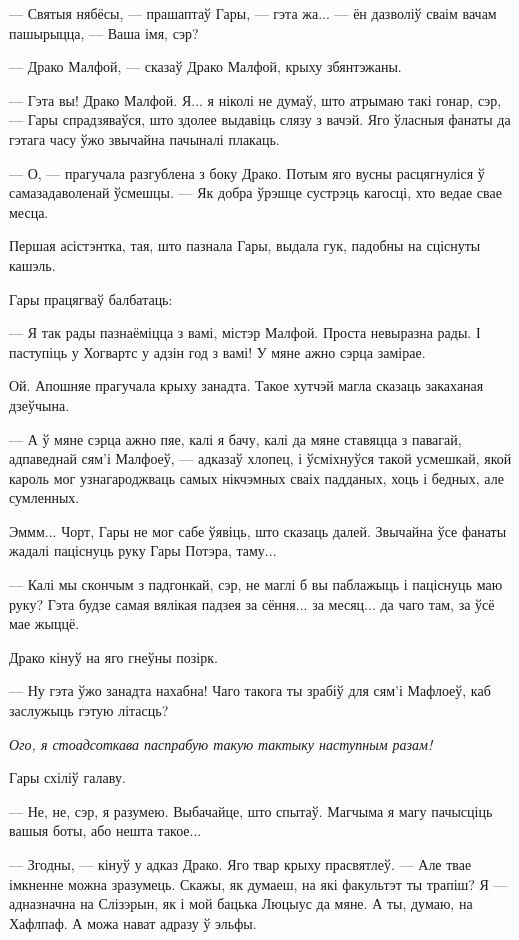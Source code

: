 --- Святыя нябёсы, --- прашаптаў Гары, --- гэта жа... --- ён дазволіў сваім вачам 
пашырыцца, --- Ваша імя, сэр?

--- Драко Малфой, --- сказаў Драко Малфой, крыху збянтэжаны.

--- Гэта вы! Драко Малфой. Я... я ніколі не думаў, што атрымаю такі гонар, сэр, --- 
Гары спрадзяваўся, што здолее выдавіць слязу з вачэй. Яго ўласныя фанаты да гэтага часу 
ўжо звычайна пачыналі плакаць.

--- О, --- прагучала разгублена з боку Драко. Потым яго вусны расцягнуліся ў самазадаволенай
ўсмешцы. --- Як добра ўрэшце сустрэць кагосці, хто ведае свае месца.

Першая асістэнтка, тая, што пазнала Гары, выдала гук, падобны на сціснуты кашэль.

Гары працягваў балбатаць:

--- Я так рады пазнаёміцца з вамі, містэр Малфой. Проста невыразна рады. І паступіць у Хогвартс 
у адзін год з вамі! У мяне ажно сэрца замірае.

Ой. Апошняе прагучала крыху занадта. Такое хутчэй магла сказаць закаханая дзеўчына.

--- А ў мяне сэрца ажно пяе, калі я бачу, калі да мяне ставяцца з павагай, адпаведнай 
сям'і Малфоеў, --- адказаў хлопец, і ўсміхнуўся такой усмешкай, якой кароль мог узнагароджваць
самых нікчэмных сваіх падданых, хоць і бедных, але сумленных.

Эммм... Чорт, Гары не мог сабе ўявіць, што сказаць далей. Звычайна ўсе фанаты жадалі паціснуць
руку Гары Потэра, таму...

--- Калі мы скончым з падгонкай, сэр, не маглі б вы паблажыць і паціснуць маю руку? Гэта 
будзе самая вялікая падзея за сёння... за месяц... да чаго там, за ўсё мае жыццё.

Драко кінуў на яго гнеўны позірк.

--- Ну гэта ўжо занадта нахабна! Чаго такога ты зрабіў для сям'і Мафлоеў,
 каб заслужыць гэтую літасць?

\emph{Ого, я стоадсоткава паспрабую такую тактыку наступным разам!} 

Гары схіліў галаву.

--- Не, не, сэр, я разумею. Выбачайце, што спытаў. Магчыма я магу пачысціць вашыя боты, або
нешта такое...

--- Згодны, --- кінуў у адказ Драко. Яго твар крыху прасвятлеў. --- Але твае імкненне можна 
зразумець. Скажы, як думаеш, на які факультэт ты трапіш? Я --- адназначна на Слізэрын, як і мой
бацька Люцыус да мяне. А ты, думаю, на Хафлпаф. А можа нават адразу ў эльфы.

